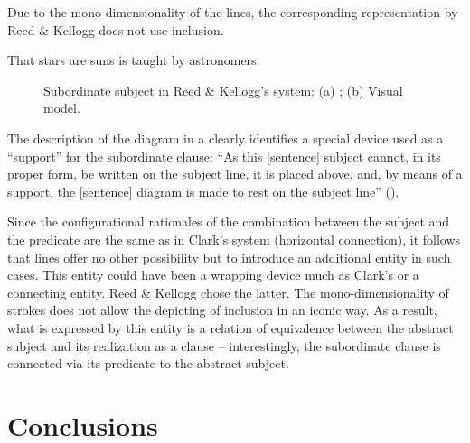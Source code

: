 \documentclass[output=paper]{langsci/langscibook}
\begin{document}
Due to the mono-dimensionality of the lines, the corresponding representation by Reed \& Kellogg does not use inclusion.

\ea \label{ex:4:5} That stars are suns is taught by astronomers. \z


\begin{figure}
    \caption{Subordinate subject in Reed \& Kellogg’s system: (a) \citeyear[137]{reed_graded_1879}; (b) Visual model.\label{fig:4:10}}
\end{figure}

The description of the diagram in a clearly identifies a special device used as a “support” for the subordinate clause: “As this [sentence] subject cannot, in its proper form, be written on the subject line, it is placed above, and, by means of a support, the [sentence] diagram is made to rest on the subject line” (\citealt[107]{reed_graded_1879}).

Since the configurational rationales of the combination between the subject and the predicate are the same as in Clark’s system (horizontal connection), it follows that lines offer no other possibility but to introduce an additional entity in such cases. This entity could have been a wrapping device much as Clark’s or a connecting entity. Reed \& Kellogg chose the latter. The mono-dimensionality of strokes does not allow the depicting of inclusion in an iconic way. As a result, what is expressed by this entity is a relation of equivalence between the abstract subject and its realization as a clause – interestingly, the subordinate clause is connected via its predicate to the abstract subject.

\section{Conclusions}\label{sec:4:5}
\end{document}
